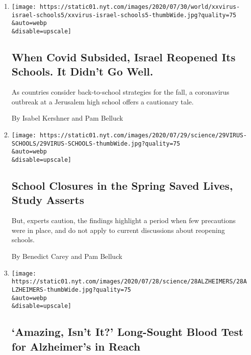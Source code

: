 \begin{enumerate}
\def\labelenumi{\arabic{enumi}.}
\item
  \href{/2020/08/04/world/middleeast/coronavirus-israel-schools-reopen.html}{}

  \texttt{[image: https://static01.nyt.com/images/2020/07/30/world/xxvirus-israel-schools5/xxvirus-israel-schools5-thumbWide.jpg?quality=75\\\&auto=webp\\\&disable=upscale]}

  \hypertarget{when-covid-subsided-israel-reopened-its-schools-it-didnt-go-well}{%
  \subsection{When Covid Subsided, Israel Reopened Its Schools. It
  Didn't Go
  Well.}\label{when-covid-subsided-israel-reopened-its-schools-it-didnt-go-well}}

  As countries consider back-to-school strategies for the fall, a
  coronavirus outbreak at a Jerusalem high school offers a cautionary
  tale.

  By Isabel Kershner and Pam Belluck
\item
  \href{/2020/07/29/health/covid-school-reopening.html}{}

  \texttt{[image: https://static01.nyt.com/images/2020/07/29/science/29VIRUS-SCHOOLS/29VIRUS-SCHOOLS-thumbWide.jpg?quality=75\\\&auto=webp\\\&disable=upscale]}

  \hypertarget{school-closures-in-the-spring-saved-lives-study-asserts}{%
  \subsection{School Closures in the Spring Saved Lives, Study
  Asserts}\label{school-closures-in-the-spring-saved-lives-study-asserts}}

  But, experts caution, the findings highlight a period when few
  precautions were in place, and do not apply to current discussions
  about reopening schools.

  By Benedict Carey and Pam Belluck
\item
  \href{/2020/07/28/health/alzheimers-blood-test.html}{}

  \texttt{[image: https://static01.nyt.com/images/2020/07/28/science/28ALZHEIMERS/28ALZHEIMERS-thumbWide.jpg?quality=75\\\&auto=webp\\\&disable=upscale]}

  \hypertarget{amazing-isnt-it-long-sought-blood-test-for-alzheimers-in-reach}{%
  \subsection{`Amazing, Isn't It?' Long-Sought Blood Test for
  Alzheimer's in
  Reach}\label{amazing-isnt-it-long-sought-blood-test-for-alzheimers-in-reach}}


\end{enumerate}

